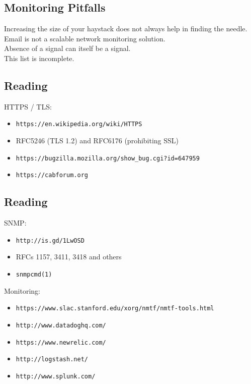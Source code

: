 \documentclass[xga]{xdvislides}
\begin{document}
\subsection{Monitoring Pitfalls}
\vspace*{\fill}
\Huge
\begin{center}
Increasing the size of your haystack does not always
help in finding the needle. \\
\vspace{.4in}
Email is not a scalable network monitoring solution. \\
\vspace{.4in}
Absence of a signal can itself be a signal. \\
\vspace{.4in}
This list is incomplete.
\end{center}
\Normalsize
\vspace*{\fill}

\subsection{Reading}
HTTPS / TLS:
\begin{itemize}
	\item {\tt https://en.wikipedia.org/wiki/HTTPS}
	\item RFC5246 (TLS 1.2) and RFC6176 (prohibiting SSL)
	\item {\tt https://bugzilla.mozilla.org/show\_bug.cgi?id=647959}
	\item {\tt https://cabforum.org}
\end{itemize}

\subsection{Reading}
SNMP:
\begin{itemize}
	\item \verb+http://is.gd/1LwOSD+
	\item RFCs 1157, 3411, 3418 and others
	\item \verb+snmpcmd(1)+
\end{itemize}

Monitoring:
\begin{itemize}
	\item {\tt https://www.slac.stanford.edu/xorg/nmtf/nmtf-tools.html}
	\item {\tt http://www.datadoghq.com/}
	\item {\tt https://www.newrelic.com/}
	\item {\tt http://logstash.net/}
	\item {\tt http://www.splunk.com/}
\end{itemize}
\end{document}
